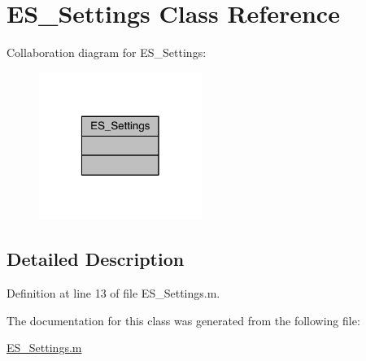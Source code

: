 \hypertarget{class_e_s___settings}{\section{E\+S\+\_\+\+Settings Class Reference}
\label{class_e_s___settings}
}


Collaboration diagram for E\+S\+\_\+\+Settings\+:\nopagebreak
\begin{figure}[H]
\begin{center}
\leavevmode
\includegraphics[width=150pt]{df/d66/class_e_s___settings__coll__graph}
\end{center}
\end{figure}


\subsection{Detailed Description}


Definition at line 13 of file E\+S\+\_\+\+Settings.\+m.



The documentation for this class was generated from the following file\+:\begin{DoxyCompactItemize}
\item 
\hyperlink{_e_s___settings_8m}{E\+S\+\_\+\+Settings.\+m}\end{DoxyCompactItemize}
